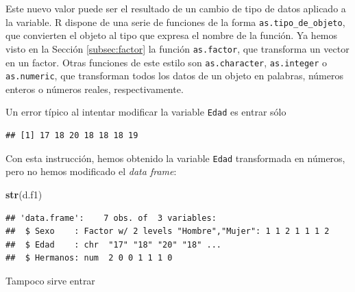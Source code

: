 \documentclass[]{book}
\newenvironment{Shaded}{\begin{snugshade}}{\end{snugshade}}
\newcommand{\KeywordTok}[1]{\textcolor[rgb]{0.13,0.29,0.53}{\textbf{#1}}}
\newcommand{\NormalTok}[1]{#1}
\newcommand{\OperatorTok}[1]{\textcolor[rgb]{0.81,0.36,0.00}{\textbf{#1}}}
\theoremstyle{definition}
\theoremstyle{definition}
\theoremstyle{definition}
\theoremstyle{remark}
\begin{document}
\begin{Shaded}
\end{Shaded}

Este nuevo valor puede ser el resultado de un cambio de tipo de datos aplicado a la variable. R dispone de una serie de funciones de la forma \texttt{as.tipo\_de\_objeto}, que convierten el objeto al tipo que expresa el nombre de la función. Ya hemos visto en la Sección \ref{subsec:factor} la función \texttt{as.factor}, que transforma un vector en un factor. Otras funciones de este estilo son \texttt{as.character}, \texttt{as.integer} o \texttt{as.numeric}, que transforman todos los datos de un objeto en palabras, números enteros o números reales, respectivamente.

Un error típico al intentar modificar la variable \texttt{Edad} es entrar sólo

\begin{Shaded}
\end{Shaded}

\begin{verbatim}
## [1] 17 18 20 18 18 18 19
\end{verbatim}

Con esta instrucción, hemos obtenido la variable \texttt{Edad} transformada en números, pero no hemos modificado el \emph{data frame}:

\begin{Shaded}
\begin{Highlighting}[]
\KeywordTok{str}\NormalTok{(d.f1)}
\end{Highlighting}
\end{Shaded}

\begin{verbatim}
## 'data.frame':    7 obs. of  3 variables:
##  $ Sexo    : Factor w/ 2 levels "Hombre","Mujer": 1 1 2 1 1 1 2
##  $ Edad    : chr  "17" "18" "20" "18" ...
##  $ Hermanos: num  2 0 0 1 1 1 0
\end{verbatim}

Tampoco sirve entrar

\begin{Shaded}
\end{Shaded}
\end{document}
